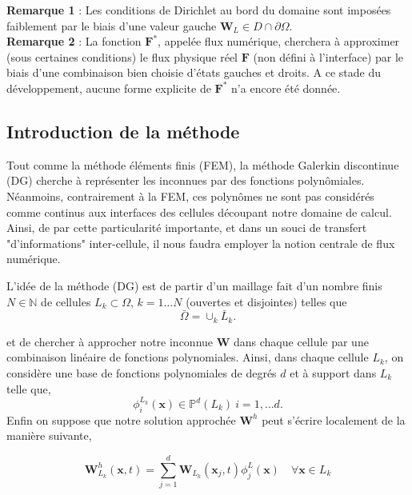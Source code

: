 \documentclass[a4paper,oneside,10pt]{report}
\begin{document}
\textbf{Remarque 1} :  Les conditions de Dirichlet au bord du domaine sont imposées faiblement par le biais d'une valeur gauche $\mathbf{W}_L \in D \cap \partial \Omega$.\\
\newline
\textbf{Remarque 2} :  La fonction $\mathbf{F}^*$, appelée flux numérique, cherchera à approximer (sous certaines conditions) le flux physique réel $\mathbf{F}$ (non défini à l'interface) par le biais d'une combinaison bien choisie d'états gauches et droits. A ce stade du développement, aucune forme explicite de  $\mathbf{F}^*$ n'a encore été donnée.


\subsection{Introduction de la méthode}
Tout comme la méthode éléments finis (FEM), la méthode Galerkin discontinue (DG) cherche à représenter les inconnues par des fonctions polynômiales. Néanmoins, contrairement à la FEM, ces polynômes ne sont pas considérés comme continus aux interfaces des cellules découpant notre domaine de calcul. Ainsi, de par cette particularité importante, et dans un souci de transfert "d'informations" inter-cellule, il nous faudra employer la notion centrale de flux numérique.\newline

 L'idée de la méthode (DG) est de partir d'un maillage fait d'un nombre finis $N\in \mathbb{N}$ de cellules  $L_k \subset \Omega$, $k=1\dots N$ (ouvertes et disjointes) telles que
\begin{equation}
\bar{\Omega} = \cup_k \bar{L}_k.
\end{equation}

et de chercher à approcher notre inconnue $\mathbf{W}$ dans chaque cellule par une combinaison linéaire de fonctions polynomiales. Ainsi, dans chaque cellule $L_k$, on considère une base de fonctions polynomiales de degrés $d$ et à support dans $L_k$ telle que,
\begin{equation}
\phi^{L_k}_i(\mathbf{x}) \in \mathbb{P}^{d}(L_k)\ i=1,\dots d.
\end{equation}
Enfin on suppose que notre solution approchée $\mathbf{W}^h$ peut s'écrire localement de la manière suivante,

\begin{equation}
\label{approx}
\mathbf{W}^h_{L_k}(\mathbf{x},t) = \sum\limits_{j=1}^d \mathbf{W}_{L_k}(\mathbf{x}_j,t) \phi_j^L (\mathbf{x}) \quad \forall \mathbf{x} \in L_k
\end{equation}
\end{document}
